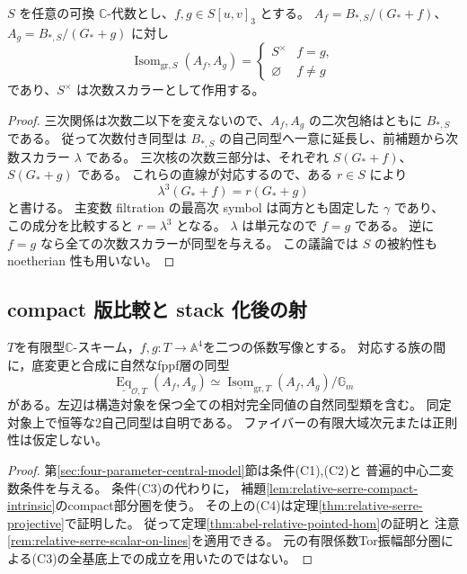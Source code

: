 \begin{corollary}[任意の係数環上の三次商の同型]
\label{cor:rigid-family-all-coeff-isom}
$S$ を任意の可換 $\mathbb C$-代数とし、$f,g\in S[u,v]_3$ とする。
$A_f=B_{*,S}/(G_*+f)$、$A_g=B_{*,S}/(G_*+g)$ に対し
\[
 \operatorname{Isom}_{\mathrm{gr},S}(A_f,A_g)
 =\begin{cases}
   S^\times & f=g,\\
   \varnothing & f\ne g
  \end{cases}
\]
であり、$S^\times$ は次数スカラーとして作用する。
\end{corollary}

\begin{proof}
三次関係は次数二以下を変えないので、$A_f,A_g$ の二次包絡はともに $B_{*,S}$ である。
従って次数付き同型は $B_{*,S}$ の自己同型へ一意に延長し、前補題から次数スカラー $\lambda$ である。
三次核の次数三部分は、それぞれ $S(G_*+f)$、$S(G_*+g)$ である。
これらの直線が対応するので、ある $r\in S$ により
\[
 \lambda^3(G_*+f)=r(G_*+g)
\]
と書ける。
主変数 filtration の最高次 symbol は両方とも固定した $\gamma$ であり、
この成分を比較すると $r=\lambda^3$ となる。
$\lambda$ は単元なので $f=g$ である。
逆に $f=g$ なら全ての次数スカラーが同型を与える。
この議論では $S$ の被約性も noetherian 性も用いない。
\end{proof}

\subsection{compact 版比較と stack 化後の射}

\begin{corollary}[全四係数族の相対同型層]
\label{cor:central-model-relative-hom}
$T$を有限型$\mathbb C$-スキーム，$f,g:T\to\mathbb A^4$を二つの係数写像とする。
対応する族の間に，底変更と合成に自然なfppf層の同型
\[
 \underline{\operatorname{Eq}}_{\mathcal O,T}(A_f,A_g)
 \simeq
 \underline{\operatorname{Isom}}_{\mathrm{gr},T}(A_f,A_g)/\mathbb G_m
\]
がある。左辺は構造対象を保つ全ての相対完全同値の自然同型類を含む。
同定対象上で恒等な2自己同型は自明である。
ファイバーの有限大域次元または正則性は仮定しない。
\end{corollary}
\begin{proof}
第\ref{sec:four-parameter-central-model}節は条件\textup{(C1),(C2)}と
普遍的中心二変数条件を与える。
条件\textup{(C3)}の代わりに，
補題\ref{lem:relative-serre-compact-intrinsic}のcompact部分圏を使う。
その上の\textup{(C4)}は定理\ref{thm:relative-serre-projective}で証明した。
従って定理\ref{thm:abel-relative-pointed-hom}の証明と
注意\ref{rem:relative-serre-scalar-on-lines}を適用できる。
元の有限係数Tor振幅部分圏による\textup{(C3)}の全基底上での成立を用いたのではない。
\end{proof}

